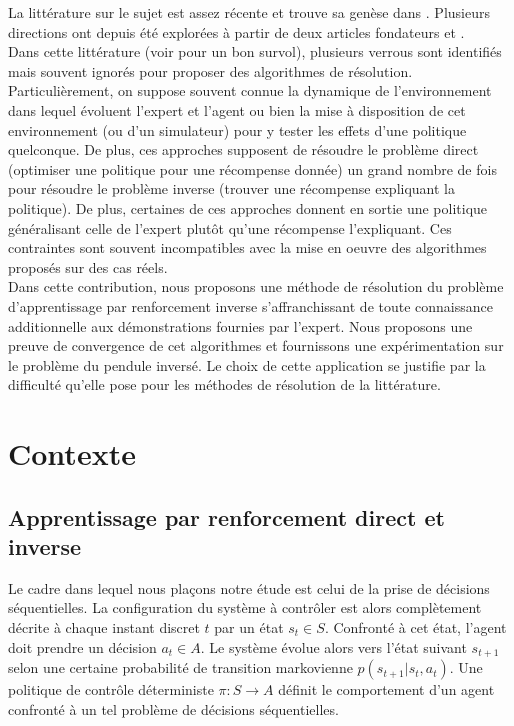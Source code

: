 \documentclass[publibook-draft]{CAp2012}
\begin{document}
La littérature sur le sujet est assez récente et trouve sa genèse dans \cite{russell1998learning}. Plusieurs directions ont depuis été explorées à partir de deux articles fondateurs \cite{ng2000algorithms} et \cite{abbeel2004apprenticeship}.\\
Dans cette littérature (voir \cite{neu2009training} pour un bon survol), plusieurs verrous sont identifiés mais souvent ignorés pour proposer des algorithmes de résolution. Particulièrement, on suppose souvent connue la dynamique de l'environnement dans lequel évoluent l'expert et l'agent ou bien la mise à disposition de cet environnement (ou d'un simulateur) pour y tester les effets d'une politique quelconque. De plus, ces approches supposent de résoudre le problème direct (optimiser une politique pour une récompense donnée) un grand nombre de fois pour résoudre le problème inverse (trouver une récompense expliquant la politique). De plus, certaines de ces approches donnent en sortie une politique généralisant celle de l'expert plutôt qu'une récompense l'expliquant. Ces contraintes sont souvent incompatibles avec la mise en oeuvre des algorithmes proposés sur des cas réels.\\

Dans cette contribution, nous proposons une méthode de résolution du problème d'apprentissage par renforcement inverse s'affranchissant de toute connaissance additionnelle aux démonstrations fournies par l'expert. Nous proposons une preuve de convergence de cet algorithmes et fournissons une expérimentation sur le problème du pendule inversé. Le choix de cette application se justifie par la difficulté  qu'elle pose pour les méthodes de résolution de la littérature.
\section{Contexte}
\label{back.sec}
\subsection{Apprentissage par renforcement direct et inverse}
Le cadre dans lequel nous plaçons notre étude est celui de la prise de décisions séquentielles. La configuration du système à contrôler est alors complètement décrite à chaque instant discret $t$ par un état $s_t \in S$. Confronté à cet état, l'agent doit prendre un décision $a_t\in A$. Le système évolue alors vers l'état suivant $s_{t+1}$ selon une certaine probabilité de transition markovienne $p(s_{t+1}|s_t, a_t)$. Une politique de contrôle déterministe $\pi : S\rightarrow A$ définit le comportement d'un agent confronté à un tel problème de décisions séquentielles.\\
\end{document}

